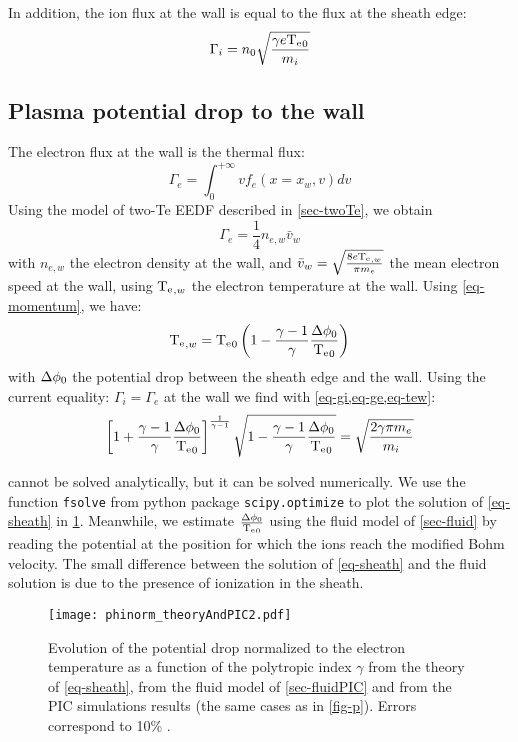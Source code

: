 In addition, the ion flux at the wall is equal to the flux at the sheath edge:
\begin{equation}
  \label{eq-gi}
  \Gamma_i = n_0 \sqrt{\frac{\gamma e \mathrm{T_e}_0}{m_i}}
\end{equation}

\subsection{Plasma potential drop to the wall}
The electron flux at the wall is the thermal flux:
\begin{equation}
  \label{eq-geki}
  \Gamma_e = \int_0^{+\infty} v f_e(x=x_w,v) dv
\end{equation}
Using the model of two-Te EEDF described in \cref{sec-twoTe}, we obtain
\begin{equation}
  \label{eq-ge}
  \Gamma_e = \frac{1}{4} n_{e,w} \bar{v}_w
\end{equation}
with $n_{e,w}$ the electron density at the wall, and $\bar{v}_w = \sqrt{\frac{8 e\mathrm{T_e}_{,w}}{\pi m_e}}$ the mean electron speed at the wall, using $\mathrm{T_e}_{,w}$ the electron temperature at the wall.
Using \cref{eq-momentum}, we have:
\begin{equation}
  \label{eq-tew}
  \mathrm{T_e}_{,w} = \mathrm{T_e}_0 \left(  1 - \frac{\gamma -1}{\gamma}\frac{\Delta \phi_0}{\mathrm{T_e}_0}  \right)
\end{equation}
with $\Delta \phi_0$ the potential drop between the sheath edge and the wall.
Using the current equality: $\Gamma_i = \Gamma_e$ at the wall we find with \cref{eq-gi,eq-ge,eq-tew}:
\begin{equation}\label{eq-sheath}
  \left[ 1 +\frac{\gamma -1}{\gamma} \frac{ \Delta \phi_0}{ \mathrm{T_e}_0}  \right]^{\frac{1}{\gamma - 1}} \sqrt{1 - \frac{\gamma -1}{\gamma}\frac{\Delta \phi_0}{\mathrm{T_e}_0}} = \sqrt{\frac{2 \gamma \pi m_e}{m_i}}
\end{equation}

 cannot be solved analytically, but it can be solved numerically.
We use the function \texttt{fsolve} from python package \texttt{scipy.optimize} to plot the solution of \cref{eq-sheath} in \cref{fig-dphinorm}.
Meanwhile, we estimate $\frac{\Delta \phi_0}{\mathrm{T_e}_0}$ using the fluid model of \cref{sec-fluid} by reading the potential at the position for which the ions reach the modified Bohm velocity.
The small difference between the solution of \cref{eq-sheath} and the fluid solution is due to the presence of ionization in the sheath.

\begin{figure}[!htbp]
  \centering
  \texttt{[image: phinorm\_theoryAndPIC2.pdf]}
  \caption{Evolution of the potential drop normalized to the electron temperature as a function of the polytropic index $\gamma$ from the theory of \cref{eq-sheath}, from the fluid model of \cref{sec-fluidPIC} and from the PIC simulations results (the same cases as in \cref{fig-p}). Errors correspond to 10\% . }
  \label{fig-dphinorm}
\end{figure}


